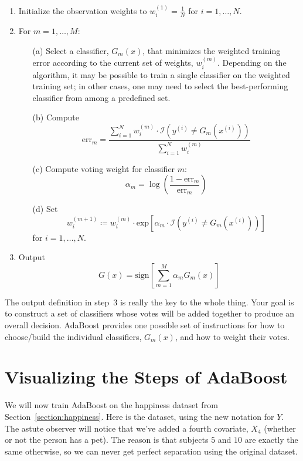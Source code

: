 \begin{enumerate}
\item Initialize the observation weights to $w_i^{(1)} = \frac{1}{N}$ for $i = 1, \dots, N$.
\item For $m = 1, \dots, M$:
    \begin{enumerate}
    \item[(a)] Select a classifier, $G_m(x)$, that minimizes the weighted training error according to the current set of weights, $w_i^{(m)}$. Depending on the algorithm, it may be possible to train a single classifier on the weighted training set; in other cases, one may need to select the best-performing classifier from among a predefined set. 
    \item[(b)] Compute
    $$ \text{err}_m = \frac{\sum_{i=1}^N w_i^{(m)} \cdot \mathcal{I}(y^{(i)} \neq G_m (x^{(i)}))}{\sum_{i=1}^N w_i^{(m)}} $$
    \item[(c)] Compute voting weight for classifier $m$:
    $$ \alpha_m = \log \left( \frac{1 - \text{err}_m}{\text{err}_m} \right) $$
    \item[(d)] Set 
    $$ w_i^{(m+1)} \coloneqq w_i^{(m)} \cdot \text{exp} \left[ \alpha_m \cdot \mathcal{I}(y^{(i)} \neq G_m (x^{(i)})) \right] $$
    for $i = 1, \dots, N$. 
    \end{enumerate}
\item Output 
$$G(x) = \text{sign} \left[ \sum_{m=1}^M \alpha_m G_m(x) \right]$$
\end{enumerate}

The output definition in step~$3$ is really the key to the whole thing. Your goal is to construct a set of classifiers whose votes will be added together to produce an overall decision. AdaBoost provides one possible set of instructions for how to choose/build the individual classifiers, $G_m(x)$, and how to weight their votes. 


\section{Visualizing the Steps of AdaBoost}

We will now train AdaBoost on the happiness dataset from Section~\ref{section:happiness}. Here is the dataset, using the new notation for $Y$. The astute observer will notice that we've added a fourth covariate, $X_4$ (whether or not the person has a pet). The reason is that subjects $5$ and $10$ are exactly the same otherwise, so we can never get perfect separation using the original dataset.


